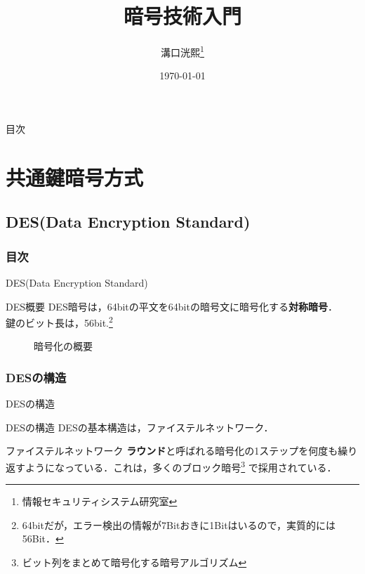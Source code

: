 \documentclass[dvipdfmx]{beamer}
\title[暗号技術入門]{暗号技術入門}
\author[K.MIZOGUCHI]{溝口洸熙\thanks{情報セキュリティシステム研究室}}
\date{\today}
\institute[KUT]{高知工科大学 情報学群}
\begin{document}
\begin{frame}
\titlepage
\end{frame}
\begin{frame}{目次}
    \tableofcontents
\end{frame}

\section{共通鍵暗号方式}
\subsection{DES(Data Encryption Standard)}
\begin{frame}
\frametitle{目次}
\tableofcontents[currentsection,sectionstyle=show/shaded,subsectionstyle=show/shaded]
\end{frame}
\begin{frame}{DES(Data Encryption Standard)}
    \begin{block}{DES概要}
        DES暗号は，64bitの平文を64bitの暗号文に暗号化する\textbf{対称暗号}．\\
        鍵のビット長は，56bit.\footnote{64bitだが，エラー検出の情報が7Bitおきに1Bitはいるので，実質的には56Bit．}
    \end{block}
    \begin{figure}[b]
        \centering
        \caption{暗号化の概要}
        \label{fig:暗号化の概要}
        
    \end{figure}
\end{frame}
\subsubsection{DESの構造}
\begin{frame}{DESの構造}
    \begin{block}{DESの構造}
        DESの基本構造は，ファイステルネットワーク．
    \end{block}
    \begin{block}{ファイステルネットワーク}
        \textbf{ラウンド}と呼ばれる暗号化の1ステップを何度も繰り返すようになっている．これは，多くのブロック暗号\footnote{ビット列をまとめて暗号化する暗号アルゴリズム} で採用されている．\\
    \end{block}
\end{frame}
\end{document}
